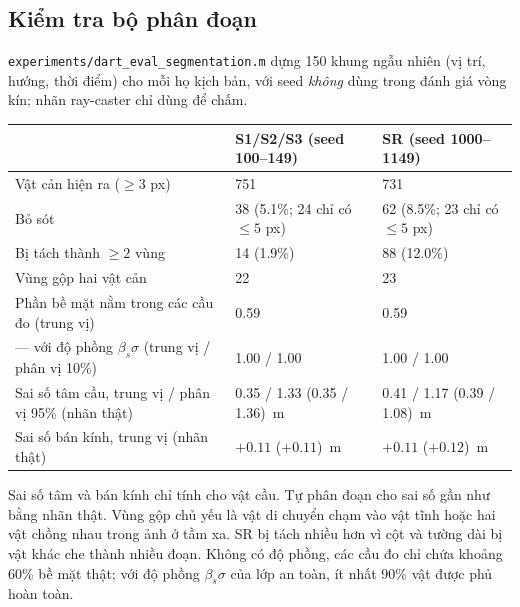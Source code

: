 \documentclass[11pt,a4paper]{article}
\numberwithin{equation}{section}
\newcommand{\code}[1]{\texttt{\small #1}}
\theoremstyle{definition}
\theoremstyle{plain}
\theoremstyle{remark}
\begin{document}
\subsection{Kiểm tra bộ phân đoạn}
\label{sec:segeval}
\code{experiments/dart\_eval\_segmentation.m} dựng 150 khung ngẫu nhiên (vị trí, hướng, thời điểm) cho mỗi họ kịch bản, với seed \emph{không} dùng trong đánh giá vòng kín; nhãn ray-caster chỉ dùng để chấm.
\begin{center}\footnotesize
\begin{tabular}{@{}p{6.2cm}p{4.0cm}p{4.0cm}@{}}
\toprule
 & S1/S2/S3 (seed 100--149) & SR (seed 1000--1149) \\ \midrule
Vật cản hiện ra ($\ge3$ px) & 751 & 731 \\
Bỏ sót & 38 (5.1\%; 24 chỉ có $\le5$ px) & 62 (8.5\%; 23 chỉ có $\le5$ px) \\
Bị tách thành $\ge2$ vùng & 14 (1.9\%) & 88 (12.0\%) \\
Vùng gộp hai vật cản & 22 & 23 \\
Phần bề mặt nằm trong các cầu đo (trung vị) & 0.59 & 0.59 \\
\quad--- với độ phồng $\beta_s\sigma$ (trung vị / phân vị 10\%) & 1.00 / 1.00 & 1.00 / 1.00 \\
Sai số tâm cầu, trung vị / phân vị 95\% (nhãn thật) & 0.35 / 1.33 (0.35 / 1.36)~m & 0.41 / 1.17 (0.39 / 1.08)~m \\
Sai số bán kính, trung vị (nhãn thật) & $+0.11$ ($+0.11$)~m & $+0.11$ ($+0.12$)~m \\
\bottomrule
\end{tabular}
\end{center}
Sai số tâm và bán kính chỉ tính cho vật cầu. Tự phân đoạn cho sai số gần như bằng nhãn thật. Vùng gộp chủ yếu là vật di chuyển chạm vào vật tĩnh hoặc hai vật chồng nhau trong ảnh ở tầm xa. SR bị tách nhiều hơn vì cột và tường dài bị vật khác che thành nhiều đoạn. Không có độ phồng, các cầu đo chỉ chứa khoảng 60\% bề mặt thật; với độ phồng $\beta_s\sigma$ của lớp an toàn, ít nhất 90\% vật được phủ hoàn toàn.
\end{document}
